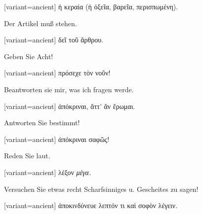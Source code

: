 \switchcolumn

\begin{greek}[variant=ancient]%
ἡ κεραία (ἡ ὀξεῖα, βαρεῖα, περισπωμένη).

\end{greek}%
\switchcolumn*

Der Artikel muß stehen. 

\switchcolumn

\begin{greek}[variant=ancient]%
δεῖ τοῦ ἄρθρου.

\end{greek}%
Geben Sie Acht! 

\switchcolumn

\begin{greek}[variant=ancient]%
πρόσεχε τὸν νοῦν!

\end{greek}%
\switchcolumn*

Beantworten sie mir, was ich fragen werde. 

\switchcolumn

\begin{greek}[variant=ancient]%
ἀπόκριναι, ἅττ' ἄν ἔρωμαι.

\end{greek}%
\switchcolumn*

Antworten Sie bestimmt! 

\switchcolumn

\begin{greek}[variant=ancient]%
ἀπόκριναι σαφῶς!

\end{greek}%
\switchcolumn*

Reden Sie laut. 

\switchcolumn

\begin{greek}[variant=ancient]%
λέξον \emph{μέγα.}

\end{greek}%
\switchcolumn*

Versuchen Sie etwas recht Scharfsinniges u. Gescheites zu sagen! 

\switchcolumn

\begin{greek}[variant=ancient]%
ἀποκινδύνευε λεπτόν τι καὶ σοφὸν λέγειν.

\end{greek}%
\switchcolumn*

